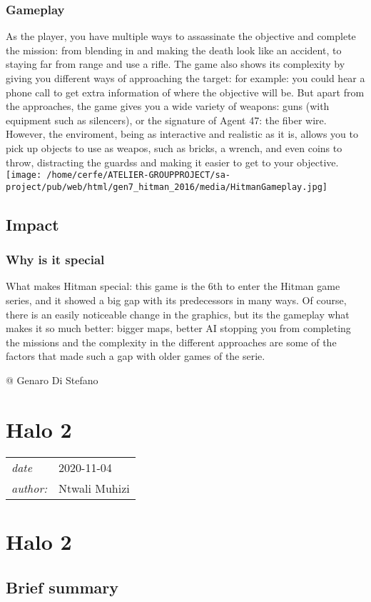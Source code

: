 \documentclass[a4paper,10pt]{book}
\newcommand{\pageHeader}[4]{
    \section{#1}
    \vspace{-0.3cm}
    \begin{table}[h!]
     \begin{tabular}{ll}
        \hline
        \textit{date} & #2 \\
        \textit{author: } & #3\\
        \hline
     \end{tabular}
    \end{table}
    \vspace{-0.3cm}
}
\begin{document}
 \subsubsection{Gameplay }
 
        As the player, you have multiple ways to assassinate the objective and complete the mission: from blending in and making the death look like an accident, to staying far from range and use a rifle. The game also shows its complexity by giving you different ways of approaching the target: for example: you could hear a phone call to get extra information of where the objective will be. But apart from the approaches, the game gives you a wide variety of weapons: guns (with equipment such as silencers), or the signature of Agent 47: the fiber wire. However, the enviroment, being as interactive and realistic as it is, allows you to pick up objects to use as weapos, such as bricks, a wrench, and even coins to throw, distracting the guardss and making it easier to get to your objective.
         \texttt{[image: /home/cerfe/ATELIER-GROUPPROJECT/sa-project/pub/web/html/gen7\_hitman\_2016/media/HitmanGameplay.jpg]}
   
 \subsection{Impact }
 \subsubsection{Why is it special }
 
        What makes Hitman special: this game is the 6th to enter the Hitman game series, and it showed a big gap with its predecessors in many ways. Of course, there is an easily noticeable change in the graphics, but its the gameplay what makes it so much better: bigger maps, better AI stopping you from completing the missions and the complexity in the different approaches are some of the factors that made such a gap with older games of the serie.
       
 
 @ Genaro Di Stefano 
 
 \newpage\pageHeader{Halo 2}{2020-11-04}{Ntwali Muhizi}{Third iteration of the halo franchise.. yes third}
 \section{ Halo 2 }
 \subsection{Brief summary }
 
\end{document}
